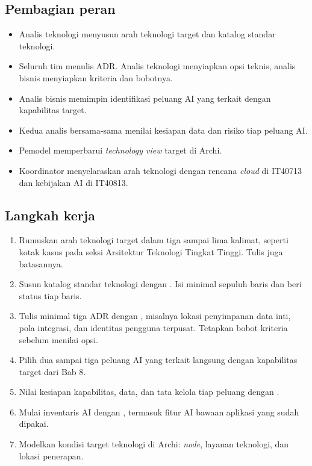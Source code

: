 \subsection*{Pembagian peran}

\begin{itemize}
  \item Analis teknologi menyusun arah teknologi target dan katalog standar
        teknologi.
  \item Seluruh tim menulis ADR. Analis teknologi menyiapkan opsi teknis,
        analis bisnis menyiapkan kriteria dan bobotnya.
  \item Analis bisnis memimpin identifikasi peluang AI yang terkait dengan
        kapabilitas target.
  \item Kedua analis bersama-sama menilai kesiapan data dan risiko tiap
        peluang AI.
  \item Pemodel memperbarui \textit{technology view} target di Archi.
  \item Koordinator menyelaraskan arah teknologi dengan rencana \textit{cloud}
        di IT40713 dan kebijakan AI di IT40813.
\end{itemize}

\subsection*{Langkah kerja}

\begin{enumerate}
  \item Rumuskan arah teknologi target dalam tiga sampai lima kalimat, seperti
        kotak kasus pada seksi Arsitektur Teknologi Tingkat Tinggi. Tulis juga
        batasannya.
  \item Susun katalog standar teknologi dengan
        .
        Isi minimal sepuluh baris dan beri status tiap baris.
  \item Tulis minimal tiga ADR dengan ,
        misalnya lokasi penyimpanan data inti, pola integrasi, dan identitas
        pengguna terpusat. Tetapkan bobot kriteria sebelum menilai opsi.
  \item Pilih dua sampai tiga peluang AI yang terkait langsung dengan
        kapabilitas target dari Bab 8.
  \item Nilai kesiapan kapabilitas, data, dan tata kelola tiap peluang dengan
        .
  \item Mulai inventaris AI dengan
        , termasuk fitur
        AI bawaan aplikasi yang sudah dipakai.
  \item Modelkan kondisi target teknologi di Archi: \textit{node}, layanan
        teknologi, dan lokasi penerapan.
\end{enumerate}

